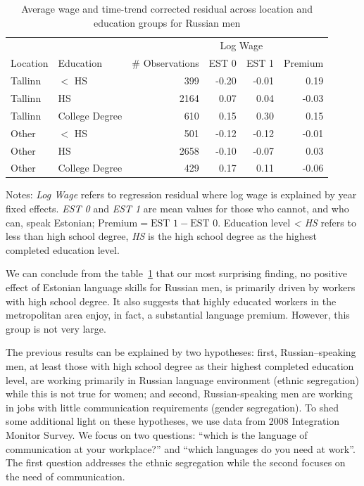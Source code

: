 \documentclass[12pt, a4paper]{article}
\begin{document}
\begin{table}[ht]
  \centering
  \caption{Average wage and time-trend corrected residual across
    location and education groups for Russian men}
  \begin{tabular}{llrrrr}
    \toprule
    & & &\multicolumn{2}{c}{Log Wage}\\
    Location & Education & \# Observations & EST 0 & EST 1 & Premium\\
    \midrule
    Tallinn & $<$ HS & 399 & -0.20 & -0.01 & 0.19 \\ 
    Tallinn & HS & 2164 & 0.07 & 0.04 & -0.03 \\ 
    Tallinn & College Degree & 610 & 0.15 & 0.30 & 0.15 \\ 
    Other & $<$ HS & 501 & -0.12 & -0.12 & -0.01 \\ 
    Other & HS & 2658 & -0.10 & -0.07 & 0.03 \\ 
    Other & College Degree & 429 & 0.17 & 0.11 & -0.06 \\ 
    \bottomrule
  \end{tabular}
  \begin{flushleft}
    Notes: \emph{Log Wage} refers to regression residual where log
    wage is explained by year fixed effects.  \emph{EST 0} and
    \emph{EST 1} are mean values for those who cannot, and who can,
    speak Estonian; $\text{Premium} = \text{EST 1} - \text{EST 0}$.
    Education level \emph{< HS} refers to less than high school
    degree, \emph{HS} is the high school degree as the highest
    completed education level.
  \end{flushleft}
  \label{tab:loc-lang-edu}
\end{table}

We can conclude from the table~\ref{tab:loc-lang-edu} that our
most surprising finding, no positive effect of Estonian language
skills for Russian men, is primarily driven by workers with
high school degree.  It also suggests that highly educated workers in
the metropolitan area enjoy, in fact, a substantial language premium.
However, this group is not very large.

The previous results can be explained by two hypotheses: first,
Russian--speaking men, at least those with high school degree as their
highest completed education level, are working
primarily in Russian language environment (ethnic segregation) while this is not true for
women; and second, Russian-speaking men are working in jobs with
little communication requirements (gender segregation).
To shed some additional light on these hypotheses, we use data
from 2008 Integration Monitor Survey.  We focus on
two questions: ``which is the language of communication at your
workplace?'' and ``which languages do you need at work''.  The first
question addresses the ethnic segregation while the second focuses on
the need of communication.  
\end{document}
